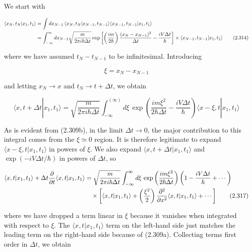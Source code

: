 \documentclass[11pt,a4paper]{article}
\begin{document}
We start with

\begin{align}
\langle x_N, t_N|x_1, t_1\rangle &= \int dx_{N-1}\,\langle x_N, t_N|x_{N-1}, t_{N-1}\rangle\langle x_{N-1}, t_{N-1}|x_1, t_1\rangle \notag \\
&= \int_{-\infty}^{\infty} dx_{N-1}\sqrt{\frac{m}{2\pi i\hbar\Delta t}}\exp\left[\left(\frac{im}{2\hbar}\right)\frac{(x_N - x_{N-1})^2}{\Delta t} - \frac{iV\Delta t}{\hbar}\right] \times \langle x_{N-1}, t_{N-1}|x_1, t_1\rangle
\tag{2.314}
\end{align}

where we have assumed $t_N - t_{N-1}$ to be infinitesimal. Introducing

\begin{equation}
\xi = x_N - x_{N-1}
\tag{2.315}
\end{equation}

and letting $x_N \to x$ and $t_N \to t + \Delta t$, we obtain

\begin{equation}
\langle x, t + \Delta t|x_1, t_1\rangle = \sqrt{\frac{m}{2\pi i\hbar\Delta t}}\int_{-\infty}^{(\infty)} d\xi\,\exp\left(\frac{im\xi^2}{2\hbar\Delta t} - \frac{iV\Delta t}{\hbar}\right)\langle x - \xi, t|x_1, t_1\rangle
\tag{2.316}
\end{equation}

As is evident from (2.309b), in the limit $\Delta t \to 0$, the major contribution to this integral comes from the $\xi \simeq 0$ region. It is therefore legitimate to expand $\langle x - \xi, t|x_1, t_1\rangle$ in powers of $\xi$. We also expand $\langle x, t + \Delta t|x_1, t_1\rangle$ and $\exp(-iV\Delta t/\hbar)$ in powers of $\Delta t$, so

\begin{align}
\langle x, t|x_1, t_1\rangle + \Delta t\frac{\partial}{\partial t}\langle x, t|x_1, t_1\rangle &= \sqrt{\frac{m}{2\pi i\hbar\Delta t}}\int_{-\infty}^{\infty} d\xi\,\exp\left(\frac{im\xi^2}{2\hbar\Delta t}\right)\left(1 - \frac{iV\Delta t}{\hbar} + \cdots\right) \notag \\
&\quad \times \left[\langle x, t|x_1, t_1\rangle + \left(\frac{\xi^2}{2}\right)\frac{\partial^2}{\partial x^2}\langle x, t|x_1, t_1\rangle + \cdots\right]
\tag{2.317}
\end{align}

where we have dropped a term linear in $\xi$ because it vanishes when integrated with respect to $\xi$. The $\langle x, t|x_1, t_1\rangle$ term on the left-hand side just matches the leading term on the right-hand side because of (2.309a). Collecting terms first order in $\Delta t$, we obtain
\end{document}
